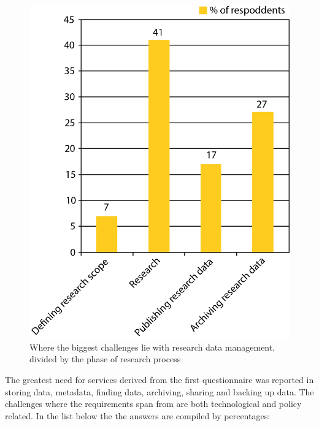 \begin{figure}
    \begin{centering}
        \includegraphics[width=\textwidth]{images/challenges2}
    \end{centering}
    \caption{Where the biggest challenges lie with research data management, divided by the phase of research process}
    \label{fig:challenges}
\end{figure}

\pagebreak

The greatest need for services derived from the first questionnaire was
reported in storing data, metadata, finding data, archiving, sharing
and backing up data. The challenges where the requirements span from are both
technological and policy related. In the list below the the answers are
compiled by percentages:

